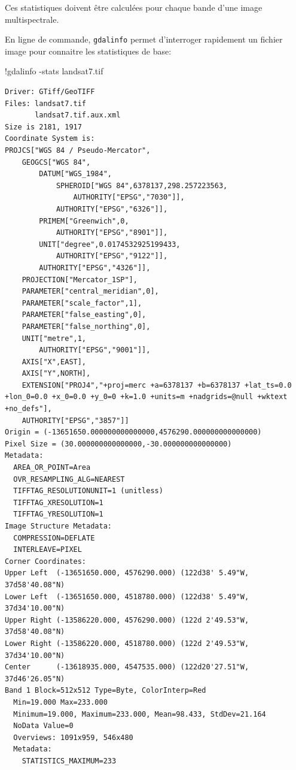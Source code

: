 \documentclass[
  11pt,
  letterpaper,
  open=any,
  twoside=false,
  french]{scrbook}
\newenvironment{Shaded}{\begin{snugshade}}{\end{snugshade}}
\newcommand{\NormalTok}[1]{\textcolor[rgb]{0.00,0.23,0.31}{#1}}
\newcommand{\OperatorTok}[1]{\textcolor[rgb]{0.37,0.37,0.37}{#1}}
\begin{document}
Ces statistiques doivent être calculées pour chaque bande d'une image
multispectrale.

En ligne de commande, \texttt{gdalinfo} permet d'interroger rapidement
un fichier image pour connaitre les statistiques de base:

\begin{Shaded}
\begin{Highlighting}[]
\OperatorTok{!}\NormalTok{gdalinfo }\OperatorTok{{-}}\NormalTok{stats landsat7.tif}
\end{Highlighting}
\end{Shaded}

\begin{verbatim}
Driver: GTiff/GeoTIFF
Files: landsat7.tif
       landsat7.tif.aux.xml
Size is 2181, 1917
Coordinate System is:
PROJCS["WGS 84 / Pseudo-Mercator",
    GEOGCS["WGS 84",
        DATUM["WGS_1984",
            SPHEROID["WGS 84",6378137,298.257223563,
                AUTHORITY["EPSG","7030"]],
            AUTHORITY["EPSG","6326"]],
        PRIMEM["Greenwich",0,
            AUTHORITY["EPSG","8901"]],
        UNIT["degree",0.0174532925199433,
            AUTHORITY["EPSG","9122"]],
        AUTHORITY["EPSG","4326"]],
    PROJECTION["Mercator_1SP"],
    PARAMETER["central_meridian",0],
    PARAMETER["scale_factor",1],
    PARAMETER["false_easting",0],
    PARAMETER["false_northing",0],
    UNIT["metre",1,
        AUTHORITY["EPSG","9001"]],
    AXIS["X",EAST],
    AXIS["Y",NORTH],
    EXTENSION["PROJ4","+proj=merc +a=6378137 +b=6378137 +lat_ts=0.0 +lon_0=0.0 +x_0=0.0 +y_0=0 +k=1.0 +units=m +nadgrids=@null +wktext +no_defs"],
    AUTHORITY["EPSG","3857"]]
Origin = (-13651650.000000000000000,4576290.000000000000000)
Pixel Size = (30.000000000000000,-30.000000000000000)
Metadata:
  AREA_OR_POINT=Area
  OVR_RESAMPLING_ALG=NEAREST
  TIFFTAG_RESOLUTIONUNIT=1 (unitless)
  TIFFTAG_XRESOLUTION=1
  TIFFTAG_YRESOLUTION=1
Image Structure Metadata:
  COMPRESSION=DEFLATE
  INTERLEAVE=PIXEL
Corner Coordinates:
Upper Left  (-13651650.000, 4576290.000) (122d38' 5.49"W, 37d58'40.08"N)
Lower Left  (-13651650.000, 4518780.000) (122d38' 5.49"W, 37d34'10.00"N)
Upper Right (-13586220.000, 4576290.000) (122d 2'49.53"W, 37d58'40.08"N)
Lower Right (-13586220.000, 4518780.000) (122d 2'49.53"W, 37d34'10.00"N)
Center      (-13618935.000, 4547535.000) (122d20'27.51"W, 37d46'26.05"N)
Band 1 Block=512x512 Type=Byte, ColorInterp=Red
  Min=19.000 Max=233.000 
  Minimum=19.000, Maximum=233.000, Mean=98.433, StdDev=21.164
  NoData Value=0
  Overviews: 1091x959, 546x480
  Metadata:
    STATISTICS_MAXIMUM=233

\end{verbatim}
\end{document}
